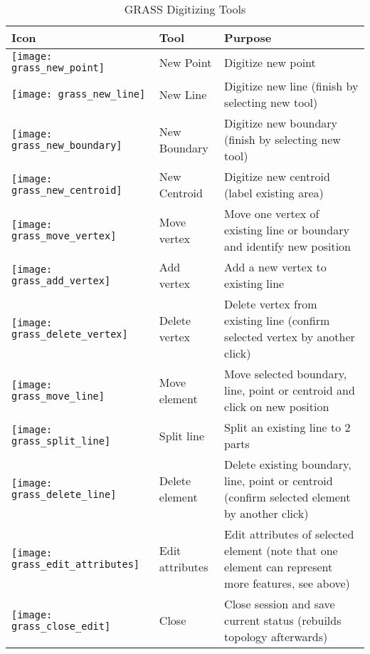 {\renewcommand{\arraystretch}{2}
\begin{table}[h]
\centering
 \begin{tabular}{|m{1cm}|m{4cm}|m{8.5cm}|}
 \hline \textbf{Icon} & \textbf{Tool} & \textbf{Purpose} \\
\hline \texttt{[image: grass\_new\_point]} & New Point & Digitize
new point \\
\hline \texttt{[image: grass\_new\_line]} & New Line & Digitize
new line (finish by selecting new tool) \\
\hline \texttt{[image: grass\_new\_boundary]} & New Boundary &
Digitize new boundary (finish by selecting new tool)\\
\hline \texttt{[image: grass\_new\_centroid]} & New Centroid &
Digitize new centroid (label existing area)\\
\hline \texttt{[image: grass\_move\_vertex]} & Move vertex & Move
one vertex of existing line or boundary and identify new position\\
\hline \texttt{[image: grass\_add\_vertex]} & Add vertex & Add a
new vertex to existing line\\
\hline \texttt{[image: grass\_delete\_vertex]} & Delete vertex &
Delete vertex from existing line (confirm selected vertex by another click)\\
\hline \texttt{[image: grass\_move\_line]} & Move element & Move
selected boundary, line, point or centroid and click on new position\\
\hline \texttt{[image: grass\_split\_line]} & Split line & Split
an existing line to 2 parts\\
\hline \texttt{[image: grass\_delete\_line]} & Delete element &
Delete existing boundary, line, point or centroid (confirm selected element by
another click)\\
\hline \texttt{[image: grass\_edit\_attributes]} & Edit attributes
& Edit attributes of selected element (note that one element can represent
more features, see above)\\
\hline \texttt{[image: grass\_close\_edit]} & Close & Close
session and save current status (rebuilds topology afterwards)\\
\hline
\end{tabular}
\caption{GRASS Digitizing Tools}\label{tab:grass_tools}
\end{table}}

